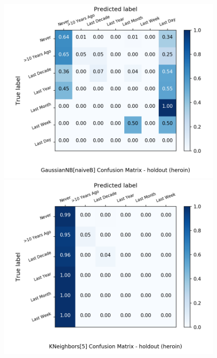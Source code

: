 \begin{figure}[H]
\begin{minipage}[b]{0.32\textwidth}
		\includegraphics[width=1.1\textwidth]{Plots/heroin_GaussianNB_naiveB_balance_False_holdout.png}
	\end{minipage}
	\begin{minipage}[b]{0.32\textwidth}
		\includegraphics[width=1.1\textwidth]{Plots/heroin_KNeighbors_5_balance_False_holdout.png}
  \end{minipage}
	\begin{minipage}[b]{0.32\textwidth}

\end{minipage}
\end{figure}
